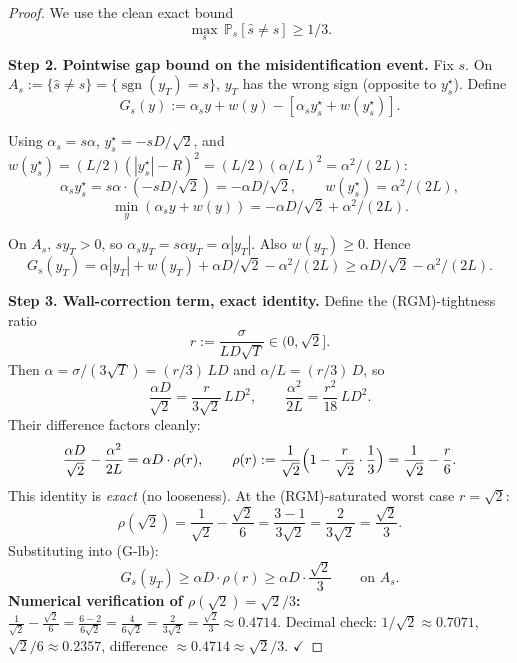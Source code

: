 \documentclass[11pt]{article}
\theoremstyle{definition}
\theoremstyle{remark}
\DeclareMathOperator{\sgn}{sgn}
\begin{document}
\begin{proof}
We use the clean exact bound
\begin{equation}
  \max_s\,\mathbb{P}_s[\hat s \neq s] \geq 1/3. \tag{MISS}
\end{equation}

\textbf{Step 2. Pointwise gap bound on the misidentification event.} Fix $s$. On $A_s := \{\hat s \neq s\} = \{\sgn(y_T) = s\}$, $y_T$ has the wrong sign (opposite to $y^\star_s$). Define
\[
  G_s(y) := \alpha_s y + w(y) - [\alpha_s y^\star_s + w(y^\star_s)].
\]

Using $\alpha_s = s\alpha$, $y^\star_s = -sD/\sqrt 2$, and $w(y^\star_s) = (L/2)(|y^\star_s| - R)^2 = (L/2)(\alpha/L)^2 = \alpha^2/(2L)$:
\[
  \alpha_s y^\star_s = s\alpha \cdot (-sD/\sqrt 2) = -\alpha D/\sqrt 2,\qquad w(y^\star_s) = \alpha^2/(2L),
\]
\[
  \min_{y}(\alpha_s y + w(y)) = -\alpha D/\sqrt 2 + \alpha^2/(2L).
\]

On $A_s$, $sy_T > 0$, so $\alpha_s y_T = s\alpha y_T = \alpha |y_T|$. Also $w(y_T) \geq 0$. Hence
\begin{equation}
  G_s(y_T) = \alpha|y_T| + w(y_T) + \alpha D/\sqrt 2 - \alpha^2/(2L) \geq \alpha D/\sqrt 2 - \alpha^2/(2L).\tag{G-lb}
\end{equation}

\textbf{Step 3. Wall-correction term, exact identity.} Define the (RGM)-tightness ratio
\[
  r := \frac{\sigma}{LD\sqrt T} \in (0, \sqrt 2].
\]
Then $\alpha = \sigma/(3\sqrt T) = (r/3)\, LD$ and $\alpha/L = (r/3)\, D$, so
\[
  \frac{\alpha D}{\sqrt 2} = \frac{r}{3\sqrt 2}\, LD^2,\qquad \frac{\alpha^2}{2L} = \frac{r^2}{18}\, LD^2.
\]
Their difference factors cleanly:
\[
  \frac{\alpha D}{\sqrt 2} - \frac{\alpha^2}{2L} = \alpha D \cdot \rho(r),\qquad \rho(r) := \frac{1}{\sqrt 2}\Bigl(1 - \frac{r}{\sqrt 2}\cdot \frac{1}{3}\Bigr) = \frac{1}{\sqrt 2} - \frac{r}{6}.
\]
This identity is \emph{exact} (no looseness). At the (RGM)-saturated worst case $r = \sqrt 2$:
\[
  \rho(\sqrt 2) = \frac{1}{\sqrt 2} - \frac{\sqrt 2}{6} = \frac{3 - 1}{3\sqrt 2} = \frac{2}{3\sqrt 2} = \frac{\sqrt 2}{3}.
\]
Substituting into (G-lb):
\begin{equation}
  G_s(y_T) \geq \alpha D \cdot \rho(r) \geq \alpha D \cdot \frac{\sqrt 2}{3}\qquad \text{on } A_s. \tag{G-final}
\end{equation}
\textbf{Numerical verification of $\rho(\sqrt 2) = \sqrt 2/3$:} $\frac{1}{\sqrt 2} - \frac{\sqrt 2}{6} = \frac{6 - 2}{6\sqrt 2} = \frac{4}{6\sqrt 2} = \frac{2}{3\sqrt 2} = \frac{\sqrt 2}{3} \approx 0.4714$. Decimal check: $1/\sqrt 2 \approx 0.7071$, $\sqrt 2/6 \approx 0.2357$, difference $\approx 0.4714 \approx \sqrt 2/3$. $\checkmark$


\end{proof}
\end{document}
